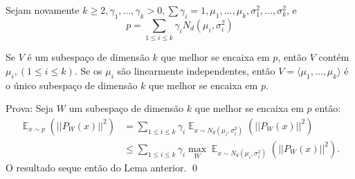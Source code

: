 Sejam novamente $k \ge 2, \gamma_1,\dots,\gamma_k>0, \sum \gamma_i = 1, \mu_1,\dots, \mu_k, \sigma_1^2, \dots, \sigma_k^2$, e 
\[p = \displaystyle\sum_{1\le i \le k} \gamma_iN_d(\mu_i, \sigma_i^2)\]

\begin{teorema}
Se $V$ \'e um subespa\c{c}o de dimens\~ao $k$ que melhor se encaixa em $p$, ent\~ao $V$ cont\'em $\mu_i, (1\le i \le k)$. Se os $\mu_i$ s\~ao linearmente independentes, ent\~ao $V= \langle \mu_1,\dots, \mu_k\rangle$ \'e o \'unico subespa\c{c}o de dimens\~ao $k$ que melhor se encaixa em $p$.
\end{teorema}
Prova: Seja $W$ um subespa\c{c}o de dimens\~ao $k$ que melhor se encaixa em $p$ ent\~ao:
\begin{align*}
\displaystyle \mathop{\mathbb{E}}_{x \sim p} \left( \vert\vert P_W (x)\vert\vert^2\right)&= \sum_{1\le i \le k} \gamma_i\displaystyle \mathop{\mathbb{E}}_{x \sim N_d(\mu_i,\sigma_i^2)} \left( \vert\vert P_W (x)\vert\vert^2\right)\\
								&\le   \sum_{1\le i \le k} \gamma_i \max_{W}\displaystyle \mathop{\mathbb{E}}_{x \sim N_d(\mu_i,\sigma_i^2)} \left( \vert\vert P_W (x)\vert\vert^2\right).
\end{align*}
O resultado seque ent\~ao do Lema anterior. \qed